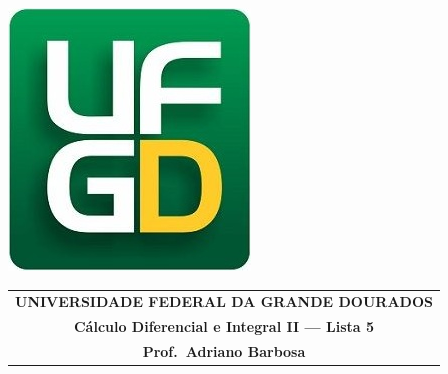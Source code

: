 \documentclass[a4paper,5pt]{amsbook}
\begin{document}
\thispagestyle{empty}
\pagestyle{empty}
\begin{minipage}[h]{0.14\textwidth}
	\includegraphics[scale=0.24]{../../ufgd.png}
\end{minipage}
\begin{minipage}[h]{\textwidth}
\begin{tabular}{c}
{{\bf UNIVERSIDADE FEDERAL DA GRANDE DOURADOS}}\\
{{\bf C\'{a}lculo Diferencial e Integral II --- Lista 5}}\\
{{\bf Prof.\ Adriano Barbosa}}\\
\end{tabular}
\vspace{-0.45cm}
%
\end{minipage}

\end{document}
